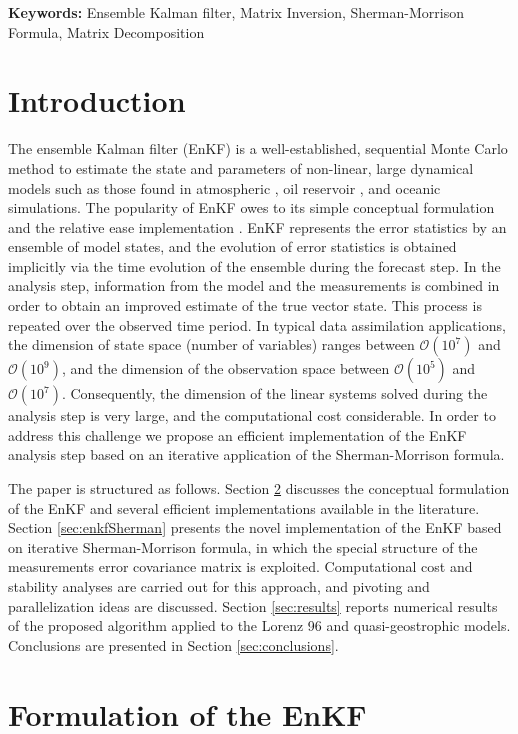 \documentclass[12pt]{article}
\newcommand{\BO}{{\mathcal O}}
\begin{document}
{\bf Keywords:} Ensemble Kalman filter, Matrix Inversion, Sherman-Morrison Formula, Matrix Decomposition


\section{Introduction}
\label{intro}
The ensemble Kalman filter (EnKF) is a well-established, sequential Monte Carlo method to estimate the state and parameters of non-linear, large dynamical models \cite{Even09A} such as those found in atmospheric \cite{Ott04}, oil reservoir \cite{Even09B}, and oceanic \cite{Even08} simulations. The popularity of EnKF owes to its simple conceptual formulation and the relative ease implementation \cite{Evensen2009}. EnKF represents the error statistics by an ensemble of model states, and the evolution of error statistics is obtained implicitly via the time evolution of the ensemble during the forecast step. In the analysis step, information from the model and the measurements is combined in order to obtain an improved estimate of the true vector state. This process is repeated over the observed time period. In typical data assimilation applications, the dimension of state space (number of variables) ranges between $\BO(10^{7})$ and $\BO(10^{9})$, and 
the dimension of the observation space between $\BO(10^{5})$ and $\BO(10^{7})$. Consequently, the dimension of the linear systems solved
during the analysis step is very large, and the computational cost considerable. In order to address this challenge we propose an efficient implementation of the EnKF analysis step based on an iterative application of the Sherman-Morrison formula.

The paper is structured as follows. Section \ref{sec:enkf} discusses the conceptual formulation of the EnKF and several efficient implementations available in the literature. Section \ref{sec:enkfSherman} presents the novel implementation of the EnKF based on iterative Sherman-Morrison formula, in which the special structure of the measurements error covariance matrix is exploited. Computational cost and stability analyses are carried out for this approach, and pivoting and parallelization ideas are discussed. Section \ref{sec:results} reports numerical results of the proposed algorithm applied to the Lorenz 96 and quasi-geostrophic models. Conclusions are presented in Section \ref{sec:conclusions}. 

\section{Formulation of the EnKF}\label{sec:enkf}
\end{document}
